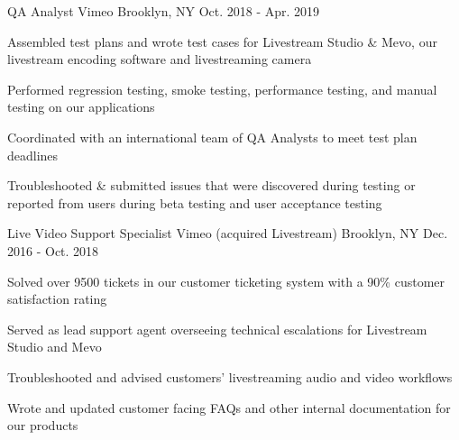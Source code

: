 \vspace{-2.0mm}

\begin{cventries}

  \cventry
    {QA Analyst} %
    {Vimeo} %
    {Brooklyn, NY} %
    {Oct. 2018 - Apr. 2019} %
    {
      \begin{cvitems} %
        \item {Assembled test plans and wrote test cases for Livestream Studio \& Mevo, our livestream encoding software and livestreaming camera}
        \item {Performed regression testing, smoke testing, performance testing, and manual testing on our applications}
        \item {Coordinated with an international team of QA Analysts to meet test plan deadlines}
        \item {Troubleshooted \& submitted issues that were discovered during testing or reported from users during beta testing and user acceptance testing}
      \end{cvitems}
    }

  \cventry
    {Live Video Support Specialist} %
    {Vimeo (acquired Livestream)} %
    {Brooklyn, NY} %
    {Dec. 2016 - Oct. 2018} %
    {
      \begin{cvitems} %
        \item {Solved over 9500 tickets in our customer ticketing system with a 90\% customer satisfaction rating}
        \item {Served as lead support agent overseeing technical escalations for Livestream Studio and Mevo}
        \item {Troubleshooted and advised customers' livestreaming audio and video workflows}
        \item {Wrote and updated customer facing FAQs and other internal documentation for our products}      
      \end{cvitems}
    }

\end{cventries}
